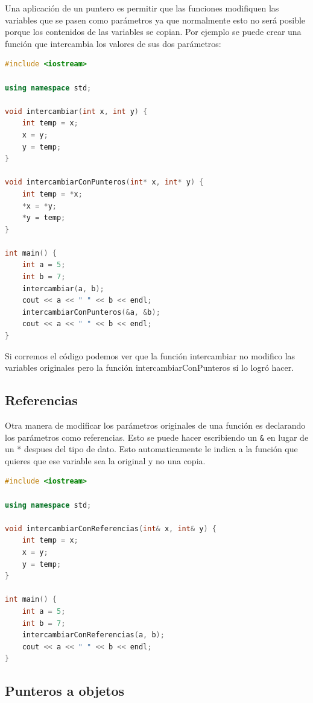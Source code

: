 \documentclass{article}
\begin{document}
Una aplicación de un puntero es permitir que las funciones modifiquen las variables que se pasen como parámetros ya que normalmente esto no será posible porque los contenidos de las variables se copian. Por ejemplo se puede crear una función que intercambia los valores de sus dos parámetros:

\begin{lstlisting}[language=C++, title=Funciones con punteros]
#include <iostream>

using namespace std;

void intercambiar(int x, int y) {
	int temp = x;
	x = y;
	y = temp;
}

void intercambiarConPunteros(int* x, int* y) {
	int temp = *x;
	*x = *y;
	*y = temp;
}

int main() {
	int a = 5;
	int b = 7;
	intercambiar(a, b);
	cout << a << " " << b << endl;
	intercambiarConPunteros(&a, &b);
	cout << a << " " << b << endl;
}
\end{lstlisting}

Si corremos el código podemos ver que la función intercambiar no modifico las variables originales pero la función intercambiarConPunteros sí lo logró hacer.

\subsection{Referencias}

Otra manera de modificar los parámetros originales de una función es declarando los parámetros como referencias. Esto se puede hacer escribiendo un \lstinline{&} en lugar de un * despues del tipo de dato. Esto automaticamente le indica a la función que quieres que ese variable sea la original y no una copia.

\begin{lstlisting}[language=C++, title=Funciones con referencias]
#include <iostream>

using namespace std;

void intercambiarConReferencias(int& x, int& y) {
	int temp = x;
	x = y;
	y = temp;
}

int main() {
	int a = 5;
	int b = 7;
	intercambiarConReferencias(a, b);
	cout << a << " " << b << endl;
}
\end{lstlisting}

\subsection{Punteros a objetos}
\end{document}
